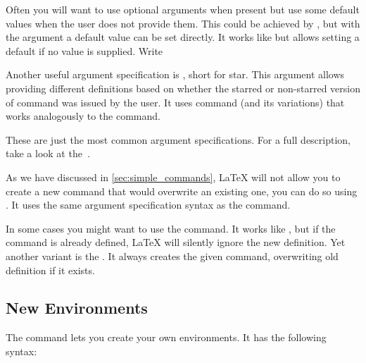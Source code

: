 Often you will want to use optional arguments when present but use some default
values when the user does not provide them. This could be achieved by
, but with the  argument a default value can be set directly.
It works like  but allows setting a default
if no value is supplied. Write


Another useful argument specification is , short for star. This
argument allows providing different definitions based on whether the
starred or non-starred version of command was issued by the user. It uses
 command (and its variations)
that works analogously to the  command.

\begin{chktexignore}
\end{chktexignore}

These are just the most common argument specifications. For a full description,
take a look at the~\cite{usrguide3}.

As we have discussed in \autoref{sec:simple_commands}, \LaTeX{} will not allow
you to create a new command that would overwrite an existing one, you can do so
using . It uses the same argument specification
syntax as the  command.

In some cases you might want to use the  command.
It works like , but if the command is already defined,
\LaTeX{} will silently ignore the new definition. Yet another variant is the
. It always creates the given command, overwriting
old definition if it exists.

\subsection{New Environments}
The  command lets you create your own environments. It has the
following syntax:

